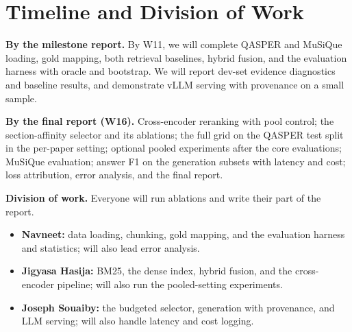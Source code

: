 \documentclass[sigconf, nonacm]{acmart}
\newcommand{\minihead}[1]{{\noindent\textbf{#1.} }}
\begin{document}
\section{Timeline and Division of Work}

\minihead{By the milestone report} By W11, we will complete QASPER and MuSiQue loading, gold mapping, both retrieval baselines, hybrid fusion, and the evaluation harness with oracle and bootstrap. We will report dev-set evidence diagnostics and baseline results, and demonstrate vLLM serving with provenance on a small sample.

\minihead{By the final report (W16)} Cross-encoder reranking with pool control; the section-affinity selector and its ablations; the full grid on the QASPER test split in the per-paper setting; optional pooled experiments after the core evaluations; MuSiQue evaluation; answer F1 on the generation subsets with latency and cost; loss attribution, error analysis, and the final report.

\minihead{Division of work} Everyone will run ablations and write their part of the report.
\begin{itemize}[leftmargin=*]
  \item \textbf{Navneet:} data loading, chunking, gold mapping, and the evaluation harness and statistics; will also lead error analysis.
  \item \textbf{Jigyasa Hasija:} BM25, the dense index, hybrid fusion, and the cross-encoder pipeline; will also run the pooled-setting experiments.
  \item \textbf{Joseph Souaiby:} the budgeted selector, generation with provenance, and LLM serving; will also handle latency and cost logging.
\end{itemize}





\end{document}
